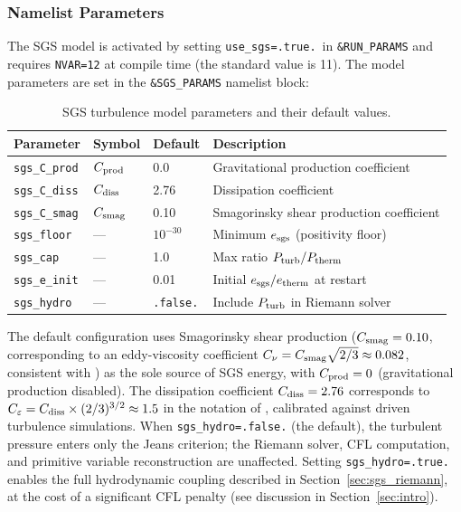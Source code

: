 \documentclass[fleqn,usenatbib]{mnras}
\newcommand{\code}[1]{\texttt{#1}}
\begin{document}
\subsubsection{Namelist Parameters}
\label{sec:sgs_params}

The SGS model is activated by setting \code{use\_sgs=.true.}\ in
\code{\&RUN\_PARAMS} and requires \code{NVAR=12} at compile time
(the standard value is 11).  The model parameters are set in the
\code{\&SGS\_PARAMS} namelist block:

\begin{table}
\centering
\caption{SGS turbulence model parameters and their default values.}
\label{tab:sgs_params}
\begin{tabular}{llll}
\toprule
Parameter & Symbol & Default & Description \\
\midrule
\code{sgs\_C\_prod}  & $C_{\rm prod}$ & 0.0 &
  Gravitational production coefficient \\
\code{sgs\_C\_diss}  & $C_{\rm diss}$ & 2.76 &
  Dissipation coefficient \\
\code{sgs\_C\_smag}  & $C_{\rm smag}$ & 0.10 &
  Smagorinsky shear production coefficient \\
\code{sgs\_floor}    & --- & $10^{-30}$ &
  Minimum $e_{\rm sgs}$ (positivity floor) \\
\code{sgs\_cap}      & --- & 1.0 &
  Max ratio $P_{\rm turb}/P_{\rm therm}$ \\
\code{sgs\_e\_init}  & --- & 0.01 &
  Initial $e_{\rm sgs}/e_{\rm therm}$ at restart \\
\code{sgs\_hydro}    & --- & \code{.false.} &
  Include $P_{\rm turb}$ in Riemann solver \\
\bottomrule
\end{tabular}
\end{table}

The default configuration uses Smagorinsky shear production
($C_{\rm smag} = 0.10$, corresponding to an eddy-viscosity
coefficient $C_\nu = C_{\rm smag}\sqrt{2/3} \approx 0.082$,
consistent with \citealt{Schmidt2006}) as the sole source of SGS
energy, with $C_{\rm prod} = 0$ (gravitational production disabled).
The dissipation coefficient $C_{\rm diss} = 2.76$ corresponds to
$C_\varepsilon = C_{\rm diss} \times (2/3)^{3/2} \approx 1.5$
in the notation of \citet{Schmidt2006}, calibrated against driven
turbulence simulations.  When \code{sgs\_hydro=.false.} (the
default), the turbulent pressure enters only the Jeans criterion;
the Riemann solver, CFL computation, and primitive variable
reconstruction are unaffected.  Setting \code{sgs\_hydro=.true.}
enables the full hydrodynamic coupling described in
Section~\ref{sec:sgs_riemann}, at the cost of a significant CFL
penalty (see discussion in Section~\ref{sec:intro}).
\end{document}
